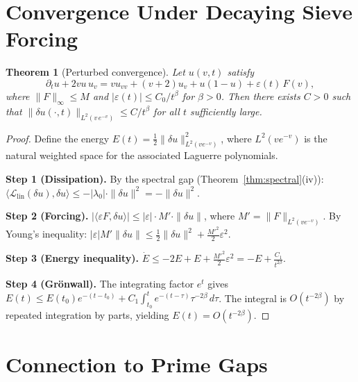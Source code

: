 \documentclass[11pt, a4paper]{amsart}
\theoremstyle{plain}
\newtheorem{theorem}{Theorem}[section]
\theoremstyle{definition}
\newcommand{\cL}{\mathcal{L}}
\newcommand{\eps}{\varepsilon}
\begin{document}
\section{Convergence Under Decaying Sieve Forcing}
\label{sec:convergence}

\begin{theorem}[Perturbed convergence]
\label{thm:convergence}
Let $u(v,t)$ satisfy
\begin{equation}\label{eq:forced}
\partial_t u + 2vu\,u_v = vu_{vv} + (v+2)u_v + u(1-u) + \eps(t)\,F(v),
\end{equation}
where $\|F\|_\infty \le M$ and $|\eps(t)| \le C_0/t^\beta$ for $\beta > 0$.
Then there exists $C > 0$ such that $\|\delta u(\cdot, t)\|_{L^2(v\,e^{-v})} \le C/t^\beta$ for all $t$ sufficiently large.
\end{theorem}

\begin{proof}
Define the energy $E(t) = \frac{1}{2}\|\delta u\|^2_{L^2(v e^{-v})}$, where $L^2(ve^{-v})$ is the natural weighted space for the associated Laguerre polynomials.

\textbf{Step 1 (Dissipation).} By the spectral gap (Theorem~\ref{thm:spectral}(iv)):
$\langle \cL_{\mathrm{lin}}(\delta u), \delta u \rangle \le -|\lambda_0| \cdot \|\delta u\|^2 = -\|\delta u\|^2.$

\textbf{Step 2 (Forcing).} $|\langle \eps F, \delta u \rangle| \le |\eps| \cdot M' \cdot \|\delta u\|$,
where $M' = \|F\|_{L^2(ve^{-v})}$.
By Young's inequality: $|\eps| M' \|\delta u\| \le \frac{1}{2}\|\delta u\|^2 + \frac{M'^2}{2}\eps^2$.

\textbf{Step 3 (Energy inequality).}
$\dot{E} \le -2E + E + \frac{M'^2}{2}\eps^2 = -E + \frac{C_1}{t^{2\beta}}.$

\textbf{Step 4 (Gr\"onwall).} The integrating factor $e^t$ gives
$E(t) \le E(t_0)e^{-(t-t_0)} + C_1\int_{t_0}^t e^{-(t-\tau)} \tau^{-2\beta}\,d\tau$.
The integral is $O(t^{-2\beta})$ by repeated integration by parts, yielding $E(t) = O(t^{-2\beta})$.
\end{proof}


\section{Connection to Prime Gaps}
\label{sec:primes}
\end{document}
